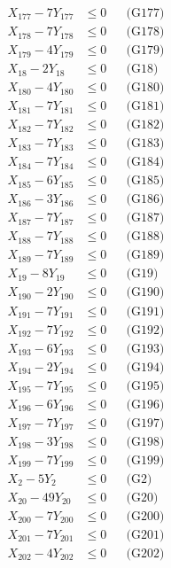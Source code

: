 \documentclass[a4paper,10pt]{article}
\begin{document}
{\begin{align}
X_{177} - 7Y_{177} &\leq 0 && \text{(G177)} \\
X_{178} - 7Y_{178} &\leq 0 && \text{(G178)} \\
X_{179} - 4Y_{179} &\leq 0 && \text{(G179)} \\
X_{18} - 2Y_{18} &\leq 0 && \text{(G18)} \\
X_{180} - 4Y_{180} &\leq 0 && \text{(G180)} \\
X_{181} - 7Y_{181} &\leq 0 && \text{(G181)} \\
X_{182} - 7Y_{182} &\leq 0 && \text{(G182)} \\
X_{183} - 7Y_{183} &\leq 0 && \text{(G183)} \\
X_{184} - 7Y_{184} &\leq 0 && \text{(G184)} \\
X_{185} - 6Y_{185} &\leq 0 && \text{(G185)} \\
X_{186} - 3Y_{186} &\leq 0 && \text{(G186)} \\
X_{187} - 7Y_{187} &\leq 0 && \text{(G187)} \\
X_{188} - 7Y_{188} &\leq 0 && \text{(G188)} \\
\allowbreak
X_{189} - 7Y_{189} &\leq 0 && \text{(G189)} \\
X_{19} - 8Y_{19} &\leq 0 && \text{(G19)} \\
X_{190} - 2Y_{190} &\leq 0 && \text{(G190)} \\
X_{191} - 7Y_{191} &\leq 0 && \text{(G191)} \\
X_{192} - 7Y_{192} &\leq 0 && \text{(G192)} \\
X_{193} - 6Y_{193} &\leq 0 && \text{(G193)} \\
X_{194} - 2Y_{194} &\leq 0 && \text{(G194)} \\
X_{195} - 7Y_{195} &\leq 0 && \text{(G195)} \\
X_{196} - 6Y_{196} &\leq 0 && \text{(G196)} \\
X_{197} - 7Y_{197} &\leq 0 && \text{(G197)} \\
X_{198} - 3Y_{198} &\leq 0 && \text{(G198)} \\
X_{199} - 7Y_{199} &\leq 0 && \text{(G199)} \\
X_{2} - 5Y_{2} &\leq 0 && \text{(G2)} \\
X_{20} - 49Y_{20} &\leq 0 && \text{(G20)} \\
X_{200} - 7Y_{200} &\leq 0 && \text{(G200)} \\
X_{201} - 7Y_{201} &\leq 0 && \text{(G201)} \\
X_{202} - 4Y_{202} &\leq 0 && \text{(G202)} \\

\end{align}}
\end{document}
